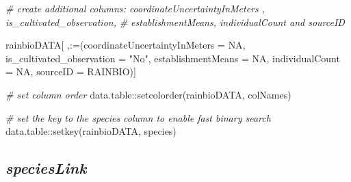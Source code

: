 \documentclass[
]{article}
\newenvironment{Shaded}{\begin{snugshade}}{\end{snugshade}}
\newcommand{\AttributeTok}[1]{\textcolor[rgb]{0.77,0.63,0.00}{#1}}
\newcommand{\CommentTok}[1]{\textcolor[rgb]{0.56,0.35,0.01}{\textit{#1}}}
\newcommand{\ConstantTok}[1]{\textcolor[rgb]{0.00,0.00,0.00}{#1}}
\newcommand{\FunctionTok}[1]{\textcolor[rgb]{0.00,0.00,0.00}{#1}}
\newcommand{\NormalTok}[1]{#1}
\newcommand{\SpecialCharTok}[1]{\textcolor[rgb]{0.00,0.00,0.00}{#1}}
\newcommand{\StringTok}[1]{\textcolor[rgb]{0.31,0.60,0.02}{#1}}
\begin{document}
\begin{Shaded}
\begin{Highlighting}[]
\CommentTok{\# create additional columns: \textquotesingle{}coordinateUncertaintyInMeters\textquotesingle{} , \textquotesingle{}is\_cultivated\_observation\textquotesingle{},}
\CommentTok{\# \textquotesingle{}establishmentMeans\textquotesingle{}, \textquotesingle{}individualCount\textquotesingle{} and \textquotesingle{}sourceID\textquotesingle{}}

\NormalTok{rainbioDATA[ ,}\StringTok{\textasciigrave{}}\AttributeTok{:=}\StringTok{\textasciigrave{}}\NormalTok{(}\AttributeTok{coordinateUncertaintyInMeters =} \ConstantTok{NA}\NormalTok{,}
                  \AttributeTok{is\_cultivated\_observation =} \StringTok{"No"}\NormalTok{,}
                  \AttributeTok{establishmentMeans =} \ConstantTok{NA}\NormalTok{,}
                  \AttributeTok{individualCount =} \ConstantTok{NA}\NormalTok{,}
                  \AttributeTok{sourceID =} \StringTok{\textquotesingle{}RAINBIO\textquotesingle{}}\NormalTok{)]}

\CommentTok{\# set column order}
\NormalTok{data.table}\SpecialCharTok{::}\FunctionTok{setcolorder}\NormalTok{(rainbioDATA, colNames)}

\CommentTok{\# set the key to the species column to enable fast binary search}
\NormalTok{data.table}\SpecialCharTok{::}\FunctionTok{setkey}\NormalTok{(rainbioDATA, }\StringTok{\textquotesingle{}species\textquotesingle{}}\NormalTok{)}
\end{Highlighting}
\end{Shaded}

\hypertarget{specieslink}{%
\subsection{\texorpdfstring{\emph{speciesLink}}{speciesLink}}\label{specieslink}}
\end{document}
